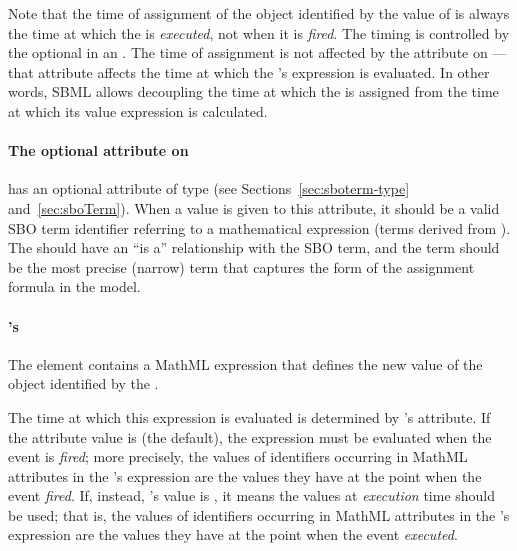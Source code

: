 Note that the time of assignment of the object identified by the
value of  is always the time at which the \Event
is \emph{executed}, not when it is \emph{fired}.  The timing is
controlled by the optional \Delay in an \Event.  The time of
assignment is not affected by the 
attribute on \Event---that attribute affects the time at which the
\EventAssignment's  expression is evaluated.  In other
words, SBML allows decoupling the time at which the
 is assigned from the time at which its value
expression is calculated.




\paragraph{The optional  attribute on }
\label{sec:eventassignment-sboterm}

\EventAssignment has an optional 
attribute of type  (see
Sections~\ref{sec:sboterm-type} and~\ref{sec:sboTerm}).  When a
value is given to this attribute, it should be a valid SBO term
identifier referring to a mathematical expression (\ie terms
derived from \sbomathformula).  The \EventAssignment should have
an ``is a'' relationship with the SBO term, and the term should be
the most precise (narrow) term that captures the form of the
assignment formula in the model.


\paragraph{'s }

The  element contains a MathML expression that defines
the new value of the object identified by the .

The time at which this expression is evaluated is determined by
\Event's  attribute.  If the
attribute value is  (the default), the expression must
be evaluated when the event is \emph{fired}; more precisely, the
values of identifiers occurring in MathML  attributes in
the \EventAssignment's  expression are the values they
have at the point when the event \emph{fired}.  If, instead,
's value is , it means
the values at \emph{execution} time should be used; that is, the
values of identifiers occurring in MathML  attributes in
the \EventAssignment's  expression are the values they
have at the point when the event \emph{executed}.


